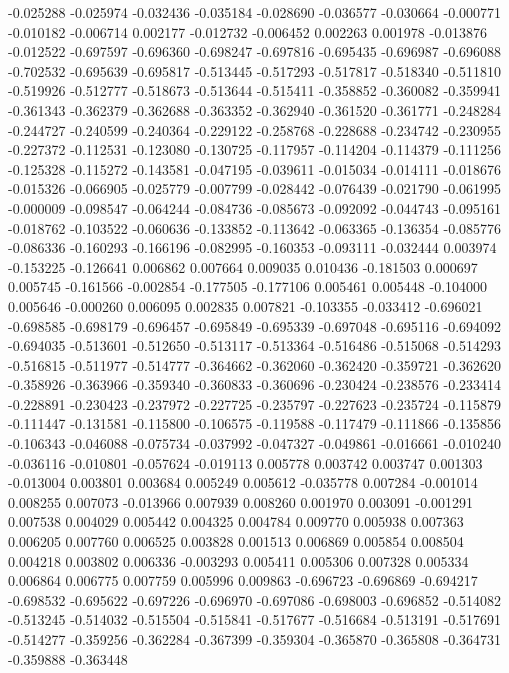 -0.025288
-0.025974
-0.032436
-0.035184
-0.028690
-0.036577
-0.030664
-0.000771
-0.010182
-0.006714
0.002177
-0.012732
-0.006452
0.002263
0.001978
-0.013876
-0.012522
-0.697597
-0.696360
-0.698247
-0.697816
-0.695435
-0.696987
-0.696088
-0.702532
-0.695639
-0.695817
-0.513445
-0.517293
-0.517817
-0.518340
-0.511810
-0.519926
-0.512777
-0.518673
-0.513644
-0.515411
-0.358852
-0.360082
-0.359941
-0.361343
-0.362379
-0.362688
-0.363352
-0.362940
-0.361520
-0.361771
-0.248284
-0.244727
-0.240599
-0.240364
-0.229122
-0.258768
-0.228688
-0.234742
-0.230955
-0.227372
-0.112531
-0.123080
-0.130725
-0.117957
-0.114204
-0.114379
-0.111256
-0.125328
-0.115272
-0.143581
-0.047195
-0.039611
-0.015034
-0.014111
-0.018676
-0.015326
-0.066905
-0.025779
-0.007799
-0.028442
-0.076439
-0.021790
-0.061995
-0.000009
-0.098547
-0.064244
-0.084736
-0.085673
-0.092092
-0.044743
-0.095161
-0.018762
-0.103522
-0.060636
-0.133852
-0.113642
-0.063365
-0.136354
-0.085776
-0.086336
-0.160293
-0.166196
-0.082995
-0.160353
-0.093111
-0.032444
0.003974
-0.153225
-0.126641
0.006862
0.007664
0.009035
0.010436
-0.181503
0.000697
0.005745
-0.161566
-0.002854
-0.177505
-0.177106
0.005461
0.005448
-0.104000
0.005646
-0.000260
0.006095
0.002835
0.007821
-0.103355
-0.033412
-0.696021
-0.698585
-0.698179
-0.696457
-0.695849
-0.695339
-0.697048
-0.695116
-0.694092
-0.694035
-0.513601
-0.512650
-0.513117
-0.513364
-0.516486
-0.515068
-0.514293
-0.516815
-0.511977
-0.514777
-0.364662
-0.362060
-0.362420
-0.359721
-0.362620
-0.358926
-0.363966
-0.359340
-0.360833
-0.360696
-0.230424
-0.238576
-0.233414
-0.228891
-0.230423
-0.237972
-0.227725
-0.235797
-0.227623
-0.235724
-0.115879
-0.111447
-0.131581
-0.115800
-0.106575
-0.119588
-0.117479
-0.111866
-0.135856
-0.106343
-0.046088
-0.075734
-0.037992
-0.047327
-0.049861
-0.016661
-0.010240
-0.036116
-0.010801
-0.057624
-0.019113
0.005778
0.003742
0.003747
0.001303
-0.013004
0.003801
0.003684
0.005249
0.005612
-0.035778
0.007284
-0.001014
0.008255
0.007073
-0.013966
0.007939
0.008260
0.001970
0.003091
-0.001291
0.007538
0.004029
0.005442
0.004325
0.004784
0.009770
0.005938
0.007363
0.006205
0.007760
0.006525
0.003828
0.001513
0.006869
0.005854
0.008504
0.004218
0.003802
0.006336
-0.003293
0.005411
0.005306
0.007328
0.005334
0.006864
0.006775
0.007759
0.005996
0.009863
-0.696723
-0.696869
-0.694217
-0.698532
-0.695622
-0.697226
-0.696970
-0.697086
-0.698003
-0.696852
-0.514082
-0.513245
-0.514032
-0.515504
-0.515841
-0.517677
-0.516684
-0.513191
-0.517691
-0.514277
-0.359256
-0.362284
-0.367399
-0.359304
-0.365870
-0.365808
-0.364731
-0.359888
-0.363448
